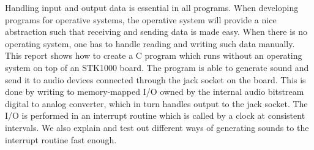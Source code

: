 Handling input and output data is essential in all programs. When
developing programs for operative systems, the operative system will
provide a nice abstraction such that receiving and sending data is made
easy. When there is no operating system, one has to handle reading and
writing such data manually. This report shows how to create a C program
which runs without an operating system on top of an STK1000 board. The
program is able to generate sound and send it to audio devices connected
through the jack socket on the board. This is done by writing to
memory-mapped I/O owned by the internal audio bitstream digital to
analog converter, which in turn handles output to the jack socket. The
I/O is performed in an interrupt routine which is called by
a clock at consistent intervals. We also explain and test out different ways of generating
sounds to the interrupt routine fast enough.
